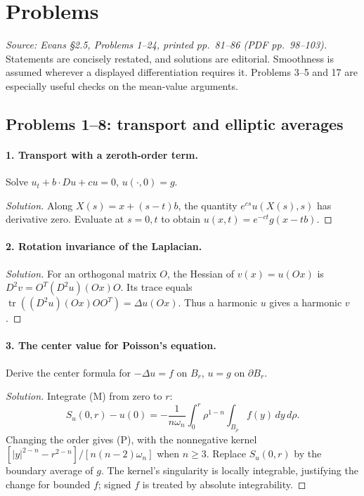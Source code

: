 \section{Problems}
\label{sec:2-5}

\noindent\textit{Source: Evans \S2.5, Problems 1--24, printed pp.~81--86
(PDF pp.~98--103).} Statements are concisely restated, and solutions
are editorial. Smoothness is assumed wherever a displayed differentiation
requires it. Problems 3--5 and 17 are especially useful checks on the
mean-value arguments.

\subsection{Problems 1--8: transport and elliptic averages}
\paragraph{1. Transport with a zeroth-order term.}
Solve $u_t+b\cdot Du+cu=0$, $u(\cdot,0)=g$.
\begin{proof}[Solution]
Along $X(s)=x+(s-t)b$, the quantity $e^{cs}u(X(s),s)$ has derivative
zero. Evaluate at $s=0,t$ to obtain $u(x,t)=e^{-ct}g(x-tb)$.
\end{proof}

\paragraph{2. Rotation invariance of the Laplacian.}
\begin{proof}[Solution]
For an orthogonal matrix $O$, the Hessian of $v(x)=u(Ox)$ is
$D^2v=O^T(D^2u)(Ox)O$. Its trace equals
$\operatorname{tr}((D^2u)(Ox)OO^T)=\Delta u(Ox)$.
Thus a harmonic $u$ gives a harmonic $v$.
\end{proof}

\paragraph{3. The center value for Poisson's equation.}
Derive the center formula for $-\Delta u=f$ on $B_r$, $u=g$ on $\partial B_r$.
\begin{proof}[Solution]
Integrate (M) from zero to $r$:
\[
 S_u(0,r)-u(0)
 =-\frac1{n\omega_n}\int_0^r\rho^{1-n}
                         \int_{B_\rho}f(y)\,dy\,d\rho.
\]
Changing the order gives (P), with the nonnegative kernel
$[|y|^{2-n}-r^{2-n}]/[n(n-2)\omega_n]$ when $n\geq3$.
Replace $S_u(0,r)$ by the boundary average of $g$.
The kernel's singularity is locally integrable, justifying the change
for bounded $f$; signed $f$ is treated by absolute integrability.
\end{proof}

